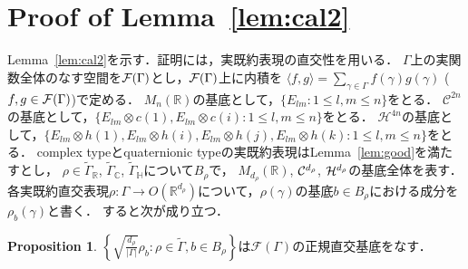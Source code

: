 \documentclass[11pt]{article}
\theoremstyle{definition}
\newtheorem{prop}[defi]{Proposition}
\begin{document}
\section{Proof of Lemma~\ref{lem:cal2}}
Lemma~\ref{lem:cal2}を示す．証明には，実既約表現の直交性を用いる．
$\Gamma$上の実関数全体のなす空間を${\cal F}(\Gamma)$とし，${\cal F}(\Gamma)$上に内積を
$\langle f,g \rangle = \sum_{\gamma \in \Gamma} f(\gamma) g(\gamma)$ ($f,g \in {\cal F}(\Gamma)$)で定める．
$M_n(\mathbb{R})$の基底として，$\{E_{lm}:1\leq l,m \leq n\}$をとる．
$\mathcal{C}^{2n}$の基底として，$\{E_{lm} \otimes c(1), E_{lm} \otimes c(i) : 1\leq l,m\leq n \}$をとる．
$\mathcal{H}^{4n}$の基底として，$\{E_{lm} \otimes h(1), E_{lm} \otimes h(i), E_{lm} \otimes h(j), E_{lm} \otimes h(k) : 1\leq l,m\leq n\}$をとる．
complex typeとquaternionic typeの実既約表現はLemma~\ref{lem:good}を満たすとし，
$\rho \in \tilde{\Gamma}_\mathbb{R}$, $\tilde{\Gamma}_\mathbb{C}$, $\tilde{\Gamma}_\mathbb{H}$について$B_\rho$で，
$M_{d_\rho}(\mathbb{R})$, ${\cal C}^{d_\rho}$, ${\cal H}^{d_\rho}$の基底全体を表す．
各実既約直交表現$\rho:\Gamma \rightarrow O(\mathbb{R}^{d_\rho})$について，$\rho(\gamma)$の基底$b \in B_\rho$における成分を$\rho_b(\gamma)$と書く．
すると次が成り立つ．
\begin{prop} \label{prop:ortho}
    $\left\{ \sqrt{ \frac{d_\rho}{|\Gamma|} } \rho_b : \rho \in \tilde{\Gamma}, b \in B_\rho \right\}$は$\mathcal{F}(\Gamma)$の正規直交基底をなす．
\end{prop}
\end{document}
